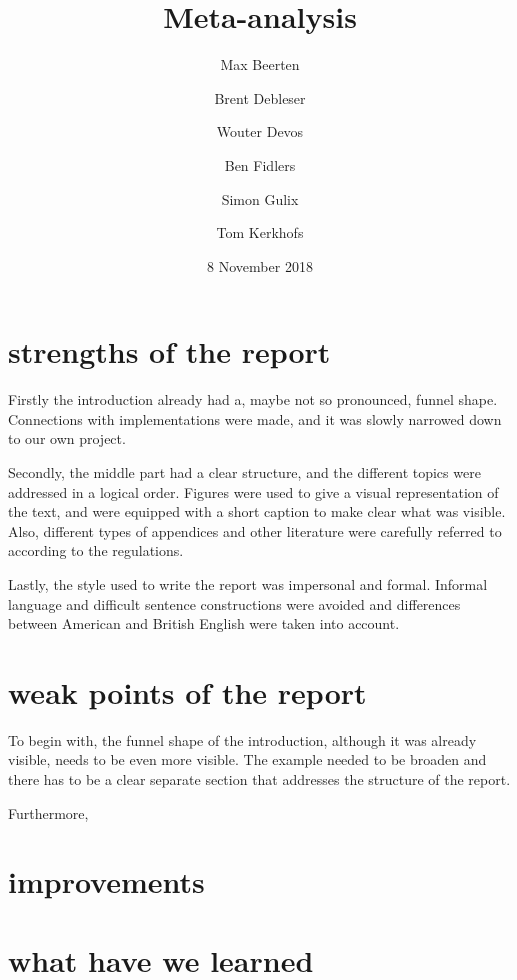 \documentclass{article}
\title{Meta-analysis}
\date{8 November 2018}
\author{Max Beerten \and Brent Debleser \and Wouter Devos \and Ben Fidlers \and Simon Gulix \and Tom Kerkhofs}
\begin{document}
\maketitle

\section{strengths of the report}

Firstly the introduction already had a, maybe not so pronounced, funnel shape. Connections with implementations were made, and it was slowly narrowed down to our own project.

Secondly, the middle part had a clear structure, and the different topics were addressed in a logical order. Figures were used to give a visual representation of the text, and were equipped with a short caption to make clear what was visible. Also, different types of appendices and other literature were carefully referred to according to the regulations.

Lastly, the style used to write the report was impersonal and formal. Informal language and difficult sentence constructions were avoided and differences between American and British English were taken into account. 

\section{weak points of the report}

To begin with, the funnel shape of the introduction, although it was already visible, needs to be even more visible. The example needed to be broaden and there has to be a clear separate section that addresses the structure of the report.

Furthermore, 

\section{improvements}

\section{what have we learned}
\end{document}
